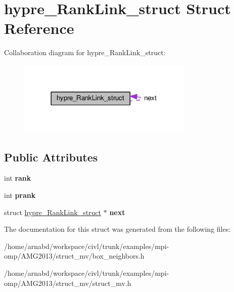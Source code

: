 \hypertarget{structhypre__RankLink__struct}{}\section{hypre\+\_\+\+Rank\+Link\+\_\+struct Struct Reference}
\label{structhypre__RankLink__struct}


Collaboration diagram for hypre\+\_\+\+Rank\+Link\+\_\+struct\+:
\nopagebreak
\begin{figure}[H]
\begin{center}
\leavevmode
\includegraphics[width=237pt]{structhypre__RankLink__struct__coll__graph}
\end{center}
\end{figure}
\subsection*{Public Attributes}
\begin{DoxyCompactItemize}
\item 
\hypertarget{structhypre__RankLink__struct_a003989a1cc2b69788a19a4efe6144426}{}int {\bfseries rank}\label{structhypre__RankLink__struct_a003989a1cc2b69788a19a4efe6144426}

\item 
\hypertarget{structhypre__RankLink__struct_ab1142d98a26a966b1cff6f9cc108dc15}{}int {\bfseries prank}\label{structhypre__RankLink__struct_ab1142d98a26a966b1cff6f9cc108dc15}

\item 
\hypertarget{structhypre__RankLink__struct_a3b7bd18655b5a487a570760b08c18412}{}struct \hyperlink{structhypre__RankLink__struct}{hypre\+\_\+\+Rank\+Link\+\_\+struct} $\ast$ {\bfseries next}\label{structhypre__RankLink__struct_a3b7bd18655b5a487a570760b08c18412}

\end{DoxyCompactItemize}


The documentation for this struct was generated from the following files\+:\begin{DoxyCompactItemize}
\item 
/home/arnabd/workspace/civl/trunk/examples/mpi-\/omp/\+A\+M\+G2013/struct\+\_\+mv/box\+\_\+neighbors.\+h\item 
/home/arnabd/workspace/civl/trunk/examples/mpi-\/omp/\+A\+M\+G2013/struct\+\_\+mv/struct\+\_\+mv.\+h\end{DoxyCompactItemize}
